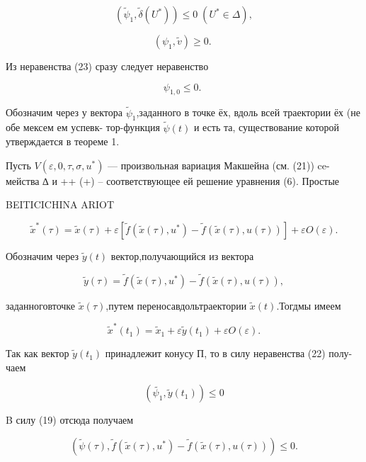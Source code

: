 \documentclass[10pt]{article}
\begin{document}
\[
\left( {{\widetilde{\psi }}_{1},\widetilde{\delta }\left( {U}^{ * }\right) }\right)  \leq  0\;\left( {{U}^{ * } \in  \Delta }\right), \tag{22}
\]

\[
\left( {{\psi }_{1},\widetilde{v}}\right)  \geq  0\text{. } \tag{23}
\]

Из неравенства (23) сразу следует неравенство

\[
{\psi }_{1,0} \leq  0\text{. } \tag{24}
\]

Обозначим через у вектора \({\widetilde{\psi }}_{1}\),заданного в точке ёх, вдоль всей траектории ёх (не обе мексем ем успевк- тор-функция \(\widetilde{\psi }\left( t\right)\) и есть та, существование которой утверждается в теореме 1.

Пусть \(V\left( {\varepsilon,0,\tau,\sigma,{u}^{ * }}\right)\) — произвольная вариация Макшейна (см. (21)) ce- мейства ∆ и ++ (+) – соответствующее ей решение уравнения (6). Простые

BEITICICHINA ARIOT

\[
{\widetilde{x}}^{ * }\left( \tau \right)  = \widetilde{x}\left( \tau \right)  + \varepsilon \left\lbrack  {\widetilde{f}\left( {\widetilde{x}\left( \tau \right),{u}^{ * }}\right)  - \widetilde{f}\left( {\widetilde{x}\left( \tau \right),u\left( \tau \right) }\right) }\right\rbrack   + {\varepsilon O}\left( \varepsilon \right).
\]

Обозначим через \(\widetilde{y}\left( t\right)\) вектор,получающийся из вектора

\[
\widetilde{y}\left( \tau \right)  = \widetilde{f}\left( {\widetilde{x}\left( \tau \right),{u}^{ * }}\right)  - \widetilde{f}\left( {\widetilde{x}\left( \tau \right),u\left( \tau \right) }\right),
\]

заданноговточке \(\widetilde{x}\left( \tau \right)\),путем переносавдольтраектории \(\widetilde{x}\left( t\right)\).Тогдмы имеем

\[
{\widetilde{x}}^{ * }\left( {t}_{1}\right)  = {\widetilde{x}}_{1} + \varepsilon \widetilde{y}\left( {t}_{1}\right)  + {\varepsilon O}\left( \varepsilon \right).
\]

Так как вектор \(\widetilde{y}\left( {t}_{1}\right)\) принадлежит конусу П, то в силу неравенства (22) полу- чаем

\[
\left( {\widetilde{{\psi }_{1}},\widetilde{y}\left( {t}_{1}\right) }\right)  \leq  0
\]

B силу (19) отсюда получаем

\[
\left( {\widetilde{\psi }\left( \tau \right),\widetilde{f}\left( {\widetilde{x}\left( \tau \right),{u}^{ * }}\right)  - \widetilde{f}\left( {\widetilde{x}\left( \tau \right),u\left( \tau \right) }\right) }\right)  \leq  0.
\]
\end{document}

